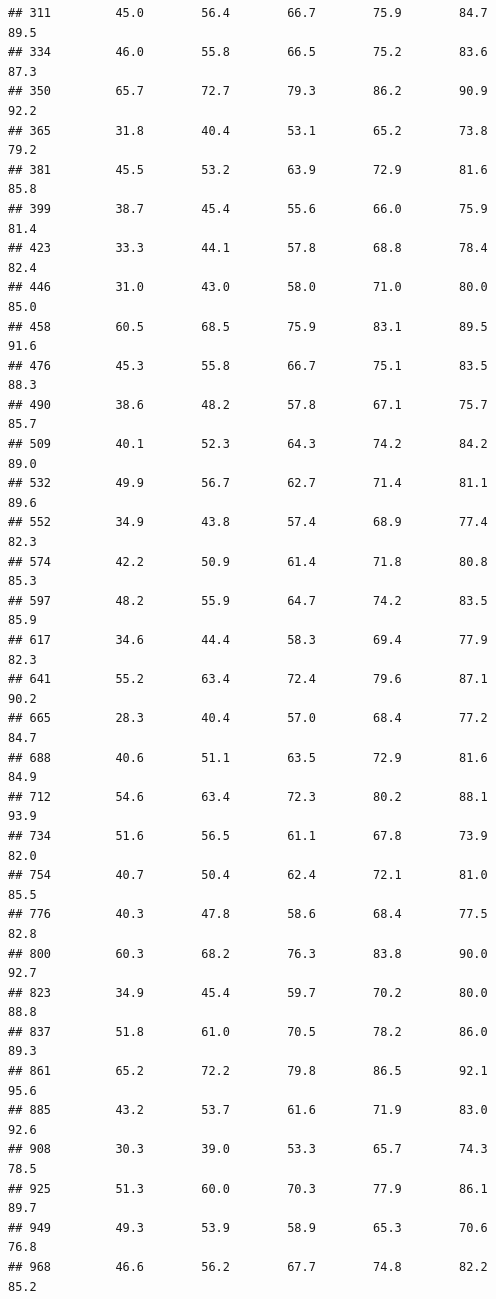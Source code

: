 \documentclass[
]{article}
\begin{document}
\begin{verbatim}
## 311         45.0        56.4        66.7        75.9        84.7        89.5
## 334         46.0        55.8        66.5        75.2        83.6        87.3
## 350         65.7        72.7        79.3        86.2        90.9        92.2
## 365         31.8        40.4        53.1        65.2        73.8        79.2
## 381         45.5        53.2        63.9        72.9        81.6        85.8
## 399         38.7        45.4        55.6        66.0        75.9        81.4
## 423         33.3        44.1        57.8        68.8        78.4        82.4
## 446         31.0        43.0        58.0        71.0        80.0        85.0
## 458         60.5        68.5        75.9        83.1        89.5        91.6
## 476         45.3        55.8        66.7        75.1        83.5        88.3
## 490         38.6        48.2        57.8        67.1        75.7        85.7
## 509         40.1        52.3        64.3        74.2        84.2        89.0
## 532         49.9        56.7        62.7        71.4        81.1        89.6
## 552         34.9        43.8        57.4        68.9        77.4        82.3
## 574         42.2        50.9        61.4        71.8        80.8        85.3
## 597         48.2        55.9        64.7        74.2        83.5        85.9
## 617         34.6        44.4        58.3        69.4        77.9        82.3
## 641         55.2        63.4        72.4        79.6        87.1        90.2
## 665         28.3        40.4        57.0        68.4        77.2        84.7
## 688         40.6        51.1        63.5        72.9        81.6        84.9
## 712         54.6        63.4        72.3        80.2        88.1        93.9
## 734         51.6        56.5        61.1        67.8        73.9        82.0
## 754         40.7        50.4        62.4        72.1        81.0        85.5
## 776         40.3        47.8        58.6        68.4        77.5        82.8
## 800         60.3        68.2        76.3        83.8        90.0        92.7
## 823         34.9        45.4        59.7        70.2        80.0        88.8
## 837         51.8        61.0        70.5        78.2        86.0        89.3
## 861         65.2        72.2        79.8        86.5        92.1        95.6
## 885         43.2        53.7        61.6        71.9        83.0        92.6
## 908         30.3        39.0        53.3        65.7        74.3        78.5
## 925         51.3        60.0        70.3        77.9        86.1        89.7
## 949         49.3        53.9        58.9        65.3        70.6        76.8
## 968         46.6        56.2        67.7        74.8        82.2        85.2

\end{verbatim}
\end{document}
